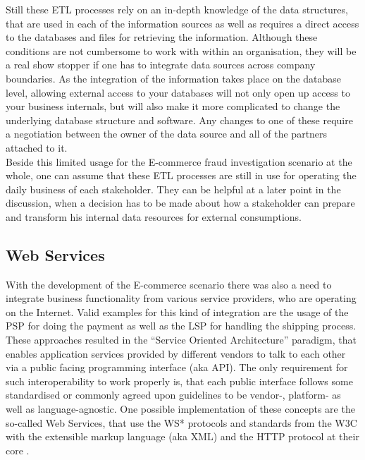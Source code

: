 Still these \gls{ETL} processes rely on an in-depth knowledge of the data structures, that are used in each of the information sources as well as requires a direct access to the databases and files for retrieving the information. Although these conditions are not cumbersome to work with within an organisation, they will be a real show stopper if one has to integrate data sources across company boundaries. As the integration of the information takes place on the database level, allowing external access to your databases will not only open up access to your business internals, but will also make it more complicated to change the underlying database structure and software. Any changes to one of these require a negotiation between the owner of the data source and all of the partners attached to it. \\

Beside this limited usage for the E-commerce fraud investigation scenario at the whole, one can assume that these \gls{ETL} processes are still in use for operating the daily business of each stakeholder. They can be helpful at a later point in the discussion, when a decision has to be made about how a stakeholder can prepare and transform his internal data resources for external consumptions.


\subsection{Web Services}
\label{subsec:web_services}

With the development of the E-commerce scenario there was also a need to integrate business functionality from various service providers, who are operating on the Internet. Valid examples for this kind of integration are the usage of the \gls{PSP} for doing the payment as well as the \gls{LSP} for handling the shipping process. These approaches resulted in the ``Service Oriented Architecture'' paradigm, that enables application services provided by different vendors to talk to each other via a public facing programming interface (aka \gls{API}). The only requirement for such interoperability to work properly is, that each public interface follows some standardised or commonly agreed upon guidelines to be vendor-, platform- as well as language-agnostic. One possible implementation of these concepts are the so-called Web Services, that use the WS* protocols and standards from the \gls{W3C} with the extensible markup language (aka \gls{XML}) and the \gls{HTTP} protocol at their core \citep{josuttis2007soa}. \\

